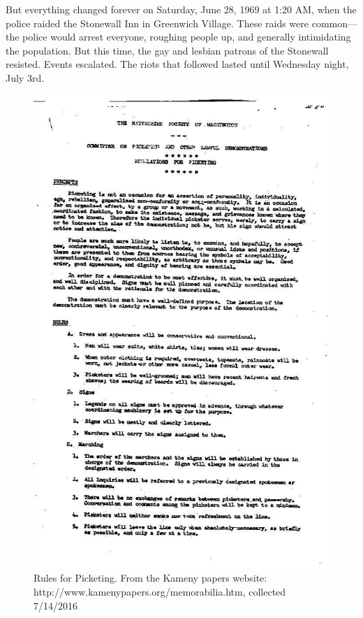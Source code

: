 But everything changed forever on Saturday, June 28, 1969 at 1:20 AM, when the police raided the Stonewall Inn in Greenwich Village. These raids were common---the police would arrest everyone, roughing people up, and generally intimidating the population. But this time, the gay and lesbian patrons of the Stonewall resisted. Events escalated. The riots that followed lasted until Wednesday night, July 3rd. 
\begin{figure}[h]
 \centering

     \includegraphics{../images/KamenyPicketInstructions.jpg}
 \caption{Rules for Picketing. From the Kameny papers website: http://www.kamenypapers.org/memorabilia.htm, collected 7/14/2016}
\label{fig: MattachineRules}
\end{figure}


